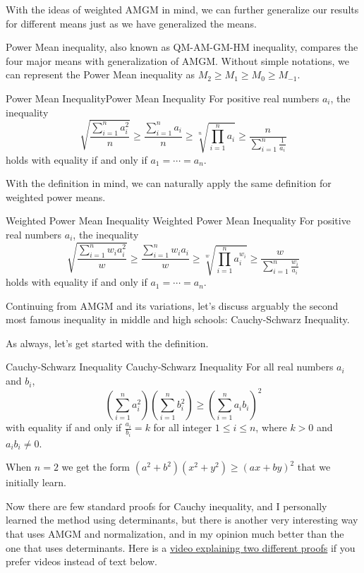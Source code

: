 \documentclass[../../../main.tex]{subfiles}
\begin{document}
With the ideas of weighted AMGM in mind, we can further generalize
our results for different means just as we have generalized the means.

Power Mean inequality, also known as QM-AM-GM-HM inequality,
compares the four major means with generalization of AMGM.
Without simple notations, we can represent the Power Mean
inequality as $M_2 \geq M_1 \geq M_0 \geq M_{-1}$.

\begin{definition}{Power Mean Inequality}{Power Mean Inequality}
For positive real numbers $a_i$, the inequality
\[
\sqrt{ \frac{\sum_{i=1}^n a_i^2}{n} }
\geq \frac{\sum_{i=1}^n a_i}{n}
\geq \sqrt[n]{\prod_{i=1}^n a_i}
\geq \frac{n}{ \sum_{i=1}^n \frac{1}{a_i} }
\]
holds with equality if and only if $a_1 = \cdots = a_n$.
\end{definition}

With the definition in mind, we can naturally apply the same
definition for weighted power means.

\begin{definition}
{Weighted Power Mean Inequality}
{Weighted Power Mean Inequality}
For positive real numbers $a_i$, the inequality
\[
\sqrt{ \frac{\sum_{i=1}^n w_i a_i^2}{w} }
\geq \frac{\sum_{i=1}^n w_i a_i}{w}
\geq \sqrt[w]{\prod_{i=1}^n a_i^{w_i}}
\geq \frac{w}{ \sum_{i=1}^n \frac{w_i}{a_i} }
\]
holds with equality if and only if $a_1 = \cdots = a_n$.
\end{definition}

Continuing from AMGM and its variations, let's discuss arguably the
second most famous inequality in middle and high schools:
Cauchy-Schwarz Inequality.

As always, let's get started with the definition.

\begin{definition}
{Cauchy-Schwarz Inequality}
{Cauchy-Schwarz Inequality}
For all real numbers $a_i$ and $b_i$,
\[
\left( \sum_{i=1}^n a_i^2 \right) \left( \sum_{i=1}^n b_i^2 \right)
\geq
\left( \sum_{i=1}^n a_i b_i \right)^2
\]
with equality if and only if $\frac{a_i}{b_i} = k$ for all integer
$1 \leq i \leq n$, where $k > 0$ and $a_ib_i \neq 0$.
\end{definition}

When $n = 2$ we get the form $(a^2 + b^2)(x^2 + y^2) \geq (ax + by)^2$
that we initially learn.

Now there are few standard proofs for Cauchy inequality,
and I personally learned the method using determinants,
but there is another very interesting way that uses AMGM and
normalization, and in my opinion much better than the one that
uses determinants. Here is a \href{https://youtu.be/OLUunhebpSg}
{video explaining two different proofs} if you prefer videos
instead of text below.
\end{document}
